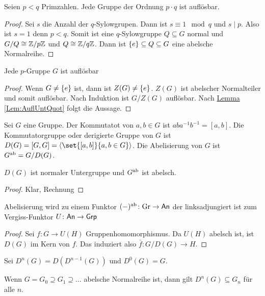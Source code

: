 \begin{Satz}
    Seien \(p<q\) Primzahlen. Jede Gruppe der Ordnung \(p\cdot q\) ist auflösbar.
\end{Satz}
\begin{proof}
    Sei \(s\) die Anzahl der \(q\)-Sylowgrupen. Dann ist \(s\equiv 1\mod q\) und \(s\mid p\). Also ist \(s=1\) denn \(p<q\). Somit ist eine \(q\)-Sylowgruppe \(Q\subseteq G\) normal und \(G/Q\cong \mathbb{Z}/p\mathbb{Z}\) und \(Q\cong\mathbb{Z}/q\mathbb{Z}\). Dann ist \(\{e\}\subseteq Q\subseteq G\) eine abelsche Normalreihe.
\end{proof}
\begin{Satz}
    Jede \(p\)-Gruppe \(G\) ist auflösbar
\end{Satz}
\begin{proof}
    Wenn \(G\neq \{e\}\) ist, dann ist \(Z(G)\neq \{e\}\). \(Z(G)\) ist abelscher Normalteiler und somit auflösbar. Nach Induktion ist \(G/Z(G)\) auflösbar. Nach \hyperref[Lem:AuflUntQuot]{Lemma \ref{Lem:AuflUntQuot}} folgt die Aussage.
\end{proof}
\begin{Def}
    Sei \(G\) eine Gruppe. Der Kommutatot von \(a,b\in G\) ist \(aba^{-1}b^{-1}=[a,b]\).
    Die Kommutatorgruppe oder derigierte Gruppe von \(G\) ist \(D(G)=[G,G]=\anglebr{\set{[a,b]}{a,b\in G}}\). Die Abelisierung von \(G\) ist \(G^{\mathrm{ab}}=G/D(G)\).
\end{Def}
\begin{Lemma}
    \(D(G)\) ist normaler Untergruppe und \(G^{\mathrm{ab}}\) ist abelsch.
\end{Lemma}
\begin{proof}
    Klar, Rechnung
\end{proof}
\begin{Satz}
    Abelisierung wird zu einem Funktor \((-)^{\mathrm{ab}}\colon\mathrm{Gr}\to\mathsf{An}\) der linksadjungiert ist zum Vergiss-Funktor \(U\colon \mathsf{An}\to \mathsf{Grp}\)
\end{Satz}
\begin{proof}
    Sei \(f\colon G\to U(H)\) Gruppenhomomorphismus. Da \(U(H)\) abelsch ist, ist \(D(G)\) im Kern von \(f\). Das induziert also \(\bar f\colon G/D(G)\to H\).
\end{proof}
\begin{Def}
    Sei \(D^n(G)=D(D^{n-1}(G))\) und \(D^0(G)=G.\)
\end{Def}
\begin{Bem}
    Wenn \(G=G_0\supseteq G_1\supseteq\dots\) abelsche Normalreihe ist, dann gilt \(D^n(G)\subseteq G_n\) für alle \(n\).
\end{Bem}
